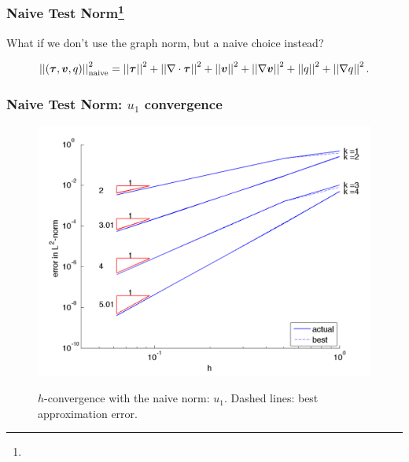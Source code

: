 \documentclass[mathserif]{beamer}
\newcommand{\NVRvect}[1]{\ensuremath\boldsymbol{#1}}
\newcommand{\vect}[1]{\ensuremath\boldsymbol{#1}}
\newcommand{\NVRtensor}[1]{\NVRvect{#1}}
\newcommand{\norm}[1]{\left|\left|#1\right|\right|}
\newcommand{\NVRgrad}{\nabla}
\newcommand{\NVRdiv}{\NVRgrad \cdot}
\newcommand{\FootSize}{\scriptsize}
\begin{document}
\begin{frame}
\frametitle{Naive Test Norm\footnote{\FootSize {}}}
What if we don't use the graph norm, but a naive choice instead?

\begin{align*}
\norm{(\NVRtensor{\tau},\vect{v}, q)}_{\rm naive}^{2} = \norm{\NVRtensor{\tau}}^{2} + \norm{\NVRdiv \NVRtensor{\tau}}^{2} + \norm{\vect{v}}^{2} + \norm{\NVRgrad \vect{v}}^{2} + \norm{q}^{2} + \norm{\NVRgrad q}^{2}.
\end{align*}
\end{frame}

\begin{frame}
\frametitle{Naive Test Norm: $u_{1}$ convergence}
\begin{figure}[!htb]
\center
{\setlength{\fboxsep}{1pt}\colorbox{pecos2}{\includegraphics[scale=.38]{../figures/u1_naive_h.png}}}
\caption{$h$-convergence with the naive norm: $u_{1}$.  Dashed lines: best approximation error.}
\end{figure}
\end{frame}
\end{document}
